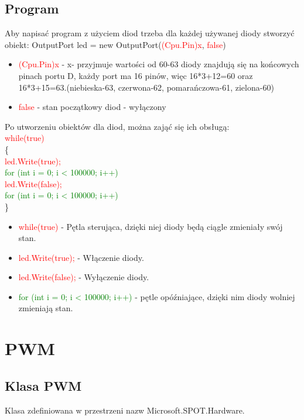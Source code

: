 \documentclass{article}
\begin{document}
\subsection{Program}
Aby napisać program z użyciem diod trzeba dla każdej używanej diody stworzyć obiekt:\newline \newline
OutputPort led = new OutputPort(\space \textcolor{red}{(Cpu.Pin)x},\space \textcolor{red}{ false})
\begin{itemize}
\item \textcolor{red}{(Cpu.Pin)x} - x- przyjmuje wartości od 60-63 diody znajdują się na \newline końcowych pinach portu D, każdy port ma 16 pinów, więc 16*3+12=60 oraz 16*3+15=63.(niebieska-63, czerwona-62, pomarańczowa-61, zielona-60)
\item \textcolor{red}{false} - stan początkowy diod - wyłączony
\end{itemize}
Po utworzeniu obiektów dla diod, można zająć się ich obsługą:
\\ \textcolor{red}{while(true)}\\
            \{\\
                \textcolor{red}{led.Write(true);}\\
                \textcolor{green}{for (int i = 0; i < 100000; i++) { }}\\
                \textcolor{red}{led.Write(false);}\\
                \textcolor{green}{for (int i = 0; i < 100000; i++) { }}\\
\}\\
\begin{itemize}
\item \textcolor{red}{while(true)} - Pętla sterująca, dzięki niej diody będą ciągle zmieniały swój stan.
\item \textcolor{red}{led.Write(true);} - Włączenie diody.
\item \textcolor{red}{led.Write(false);} - Wyłączenie diody.
\item \textcolor{green}{for (int i = 0; i < 100000; i++) { }} - pętle opóźniające, dzięki nim diody wolniej zmieniają stan.
\end{itemize}

\section{PWM}
\subsection{Klasa PWM}
Klasa zdefiniowana w przestrzeni nazw Microsoft.SPOT.Hardware. 
\end{document}
